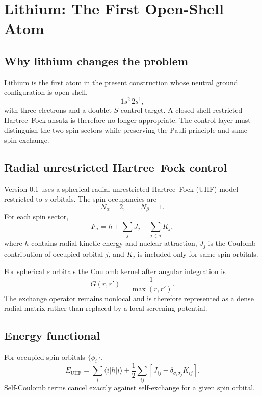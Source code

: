 \chapter{Lithium: The First Open-Shell Atom}

\section{Why lithium changes the problem}
Lithium is the first atom in the present construction whose neutral ground configuration is open-shell,
\begin{equation}
1s^2\,2s^1,
\end{equation}
with three electrons and a doublet-$S$ control target. A closed-shell restricted Hartree--Fock ansatz is therefore no longer appropriate. The control layer must distinguish the two spin sectors while preserving the Pauli principle and same-spin exchange.

\section{Radial unrestricted Hartree--Fock control}
Version 0.1 uses a spherical radial unrestricted Hartree--Fock (UHF) model restricted to $s$ orbitals. The spin occupancies are
\begin{equation}
N_\alpha=2,\qquad N_\beta=1.
\end{equation}
For each spin sector,
\begin{equation}
F_\sigma=h+\sum_j J_j-\sum_{j\in\sigma}K_j,
\end{equation}
where $h$ contains radial kinetic energy and nuclear attraction, $J_j$ is the Coulomb contribution of occupied orbital $j$, and $K_j$ is included only for same-spin orbitals.

For spherical $s$ orbitals the Coulomb kernel after angular integration is
\begin{equation}
G(r,r')=\frac{1}{\max(r,r')}.
\end{equation}
The exchange operator remains nonlocal and is therefore represented as a dense radial matrix rather than replaced by a local screening potential.

\section{Energy functional}
For occupied spin orbitals $\{\phi_i\}$,
\begin{equation}
E_{\mathrm{UHF}}=\sum_i\langle i|h|i\rangle+
\frac12\sum_{ij}\left[J_{ij}-\delta_{\sigma_i\sigma_j}K_{ij}\right].
\end{equation}
Self-Coulomb terms cancel exactly against self-exchange for a given spin orbital.

